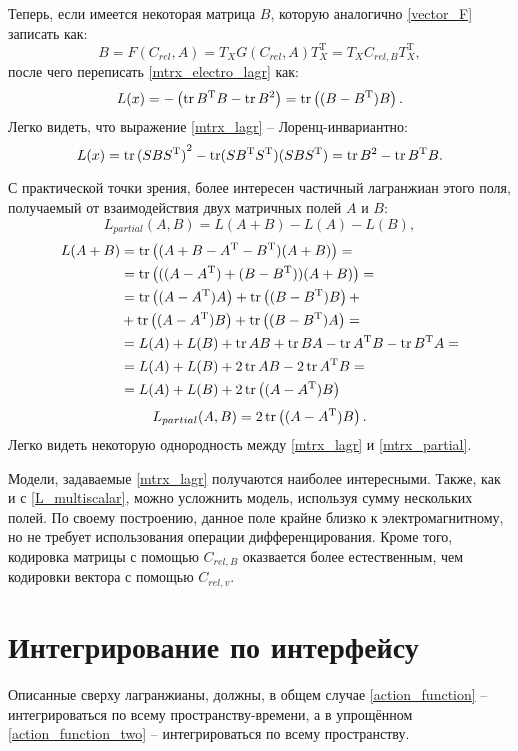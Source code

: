 Теперь, если имеется некоторая матрица $B$, которую аналогично \ref{vector_F} записать как:
\begin{equation}
	B = F(C_{rel}, A) = T_XG(C_{rel}, A)T_X^\mathrm{T} = T_XC_{rel, B}T_X^\mathrm{T},
	\label{mtrx_F}
\end{equation}
после чего переписать \ref{mtrx_electro_lagr} как:
\begin{equation}
	L(x) = -\left(\operatorname{tr} B^\mathrm{T}B - \operatorname{tr} B^2\right) = \operatorname{tr}\left((B - B^\mathrm{T})B\right).
	\label{mtrx_lagr}
\end{equation}
Легко видеть, что выражение \ref{mtrx_lagr} -- Лоренц-инвариантно:
\begin{equation}
	L(x) = \operatorname{tr} {(SBS^\mathrm{T})}^2 - \operatorname{tr} (SB^\mathrm{T}S^\mathrm{T})(SBS^\mathrm{T}) = \operatorname{tr} B^2 - \operatorname{tr} B^\mathrm{T}B.
	\label{mtrx_lagr_invar}
\end{equation}

С практической точки зрения, более интересен частичный лагранжиан этого поля, получаемый от взаимодействия двух матричных полей $A$ и $B$:
\begin{equation}
	L_{partial}(A, B) = L(A + B) - L(A) - L(B),
	\label{mtrx_partial0}
\end{equation}
\begin{align}
	L(A + B) &= \operatorname{tr}\left((A + B - A^\mathrm{T} - B^\mathrm{T})(A + B)\right) = \notag \\
			 &= \operatorname{tr}\left(((A - A^\mathrm{T}) + (B - B^\mathrm{T}))(A + B)\right) = \notag \\
			 &= \operatorname{tr}\left((A - A^\mathrm{T})A\right) + \operatorname{tr}\left((B - B^\mathrm{T})B\right) + \notag \\
			 &+ \operatorname{tr}\left((A - A^\mathrm{T})B\right) + \operatorname{tr}\left((B - B^\mathrm{T})A\right) = \notag \\
			 &= L(A) + L(B) + \operatorname{tr} AB + \operatorname{tr} BA - \operatorname{tr} A^\mathrm{T}B - \operatorname{tr} B^\mathrm{T}A = \notag \\
			 &= L(A) + L(B) + 2\operatorname{tr} AB - 2\operatorname{tr} A^\mathrm{T}B = \notag \\
			 &= L(A) + L(B) +2\operatorname{tr}\left((A - A^\mathrm{T})B\right)
	\label{mtrx_partial1}
\end{align}
\begin{equation}
	L_{partial}(A, B) = 2\operatorname{tr}\left((A - A^\mathrm{T})B\right).
	\label{mtrx_partial}
\end{equation}
Легко видеть некоторую однородность между \ref{mtrx_lagr} и \ref{mtrx_partial}. 

Модели, задаваемые \ref{mtrx_lagr} получаются наиболее интересными. Также, как и с \ref{L_multiscalar}, можно усложнить модель, используя сумму нескольких полей. По своему построению, данное поле крайне близко к электромагнитному, но не требует использования операции дифференцирования. Кроме того, кодировка матрицы с помощью  $C_{rel, B}$ оказвается более естественным, чем кодировки вектора с помощью $C_{rel, v}$.

\section{Интегрирование по интерфейсу}
Описанные сверху лагранжианы, должны, в общем случае \ref{action_function} -- интегрироваться по всему пространству-времени, а в упрощённом \ref{action_function_two} -- интегрироваться по всему пространству.
